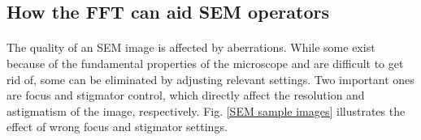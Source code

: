 \documentclass[12pt, twocolumn]{report}
\begin{document}
\subsection{How the FFT can aid SEM operators} \label{How the FFT can aid SEM operators}
\paragraph{}
The quality of an SEM image is affected by aberrations. While some exist because of the fundamental properties of the microscope and are difficult to get rid of, some can be eliminated by adjusting relevant settings. Two important ones are focus and stigmator control, which directly affect the resolution and astigmatism of the image, respectively. Fig. \ref{SEM sample images} illustrates the effect of wrong focus and stigmator settings.
\end{document}
